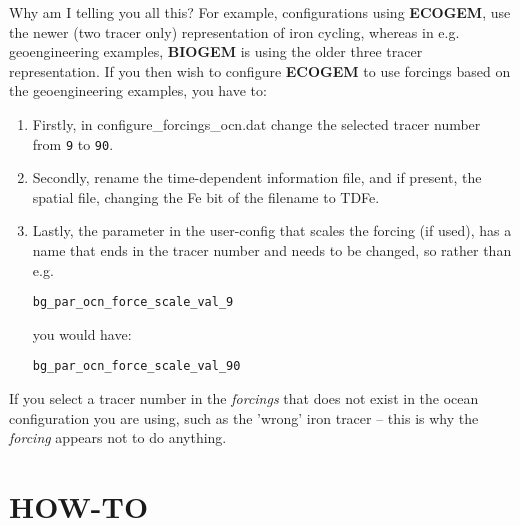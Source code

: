 \documentclass[11pt,fleqn]{book} %
\begin{document}
Why am I telling you all this? For example, configurations using \textbf{ECOGEM}, use the newer (two tracer only) representation of iron cycling, whereas in e.g. geoengineering examples, \textbf{BIOGEM} is using the older three tracer representation. If you then wish to configure \textbf{ECOGEM} to use forcings based on the geoengineering examples, you have to:

\begin{enumerate}[noitemsep]
\item Firstly, in \textsf{\footnotesize configure\_forcings\_ocn.dat} change the selected tracer number from \texttt{9} to \texttt{90}.
\item Secondly, rename the time-dependent information file, and if present, the spatial file, changing the \textsf{\footnotesize Fe} bit of the filename to \textsf{\footnotesize TDFe}.
\item Lastly, the parameter in the user-config that scales the forcing (if used), has a name that ends in the tracer number and needs to be changed, so rather than e.g.
\vspace{-1mm}\small\begin{verbatim}
bg_par_ocn_force_scale_val_9
\end{verbatim}\vspace{-1mm}\normalsize
you would have:
\vspace{-1mm}\small\begin{verbatim}
bg_par_ocn_force_scale_val_90
\end{verbatim}\vspace{-1mm}\normalsize

\end{enumerate}

If you select a tracer number in the \textit{forcings} that does not exist in the ocean configuration you are using, such as the 'wrong' iron tracer -- this is why the \textit{forcing} appears not to do anything.


\cleardoublepage


\chapter{HOW-TO}
\end{document}

